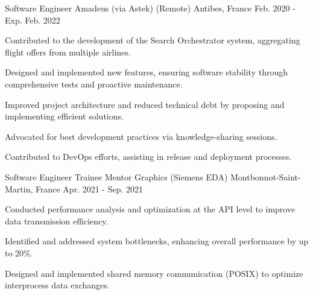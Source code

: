 
  \cventry
    {Software Engineer} %
    {Amadeus (via Astek)} %
    {(Remote) Antibes, France} %
    {Feb. 2020 - Exp. Feb. 2022} %
    {
      \begin{cvitems} %
        \item {Contributed to the development of the Search Orchestrator system, aggregating flight offers from multiple airlines.}
        \item {Designed and implemented new features, ensuring software stability through comprehensive tests and proactive maintenance.}
        \item {Improved project architecture and reduced technical debt by proposing and implementing efficient solutions.}
        \item {Advocated for best development practices via knowledge-sharing sessions.}
        \item {Contributed to DevOps efforts, assisting in release and deployment processes.}
      \end{cvitems}
    }

  \cventry
    {Software Engineer Trainee} %
    {Mentor Graphics (Siemens EDA)} %
    {Montbonnot-Saint-Martin, France} %
    {Apr. 2021 - Sep. 2021} %
    {
      \begin{cvitems} %
        \item {Conducted performance analysis and optimization at the API level to improve data transmission efficiency.}
        \item {Identified and addressed system bottlenecks, enhancing overall performance by up to 20\%.}
        \item {Designed and implemented shared memory communication (POSIX) to optimize interprocess data exchanges.}
      \end{cvitems}
    }

